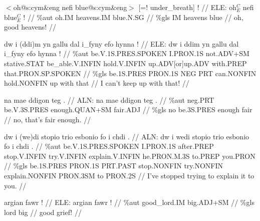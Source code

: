 \documentclass[a4paper,10pt]{article}
\begin{document}
\ex
\begingl[lingstyle=gergl]
\glchat $<$oh@s:cym\&eng nefi blue@s:cym\&eng$>$ [=! under\_breath] ! //
\glsurface ELE:  oh$^{C}_{E}$ nefi blue$^{C}_{E}$ !  //
\glauto \%aut  oh{\scriptsize .IM} heavens{\scriptsize .IM} blue{\scriptsize .N.SG}   //
\glmanual \%gls  IM heavens blue   //
\gleng oh, good heavens! //
\endgl
\xe

\ex
\begingl[lingstyle=gergl]
\glchat dw i (ddi)m yn gallu dal i\_fyny efo hynna ! //
\glsurface ELE:  dw i ddim yn gallu dal i\_fyny efo hynna !  //
\glauto \%aut  be{\scriptsize .V.1S.PRES.SPOKEN} I{\scriptsize .PRON.1S} not{\scriptsize .ADV+SM} stative{\scriptsize .STAT} be\_able{\scriptsize .V.INFIN} hold{\scriptsize .V.INFIN} up{\scriptsize .ADV[or]up.ADV} with{\scriptsize .PREP} that{\scriptsize .PRON.SP.SPOKEN}   //
\glmanual \%gls  be{\scriptsize .1S.PRES} PRON{\scriptsize .1S} NEG PRT can{\scriptsize .NONFIN} hold{\scriptsize .NONFIN} up with that   //
\gleng I can't keep up with that! //
\endgl
\xe

\ex
\begingl[lingstyle=gergl]
\glchat na mae ddigon teg . //
\glsurface ALN:  na mae ddigon teg .  //
\glauto \%aut  neg{\scriptsize .PRT} be{\scriptsize .V.3S.PRES} enough{\scriptsize .QUAN+SM} fair{\scriptsize .ADJ}   //
\glmanual \%gls  no be{\scriptsize .3S.PRES} enough fair   //
\gleng no, that's fair enough. //
\endgl
\xe

\ex
\begingl[lingstyle=gergl]
\glchat dw i (we)di stopio trio esbonio fo i chdi . //
\glsurface ALN:  dw i wedi stopio trio esbonio fo i chdi .  //
\glauto \%aut  be{\scriptsize .V.1S.PRES.SPOKEN} I{\scriptsize .PRON.1S} after{\scriptsize .PREP} stop{\scriptsize .V.INFIN} try{\scriptsize .V.INFIN} explain{\scriptsize .V.INFIN} he{\scriptsize .PRON.M.3S} to{\scriptsize .PREP} you{\scriptsize .PRON}   //
\glmanual \%gls  be{\scriptsize .1S.PRES} PRON{\scriptsize .1S} PRT{\scriptsize .PAST} stop{\scriptsize .NONFIN} try{\scriptsize .NONFIN} explain{\scriptsize .NONFIN} PRON{\scriptsize .3SM} to PRON{\scriptsize .2S}   //
\gleng I've stopped trying to explain it to you. //
\endgl
\xe

\ex
\begingl[lingstyle=gergl]
\glchat argian fawr ! //
\glsurface ELE:  argian fawr !  //
\glauto \%aut  good\_lord{\scriptsize .IM} big{\scriptsize .ADJ+SM}   //
\glmanual \%gls  lord big   //
\gleng good grief! //
\endgl
\xe
\end{document}
